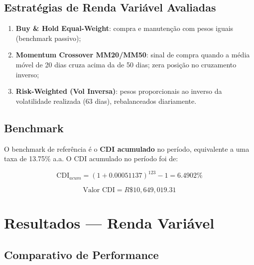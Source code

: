 \documentclass[a4paper, 12pt]{article}
\begin{document}
\subsection{Estratégias de Renda Variável Avaliadas}
\begin{enumerate}
    \item \textbf{Buy \& Hold Equal-Weight}: compra e manutenção com pesos iguais (benchmark passivo);
    \item \textbf{Momentum Crossover MM20/MM50}: sinal de compra quando a média móvel de 20 dias
          cruza acima da de 50 dias; zera posição no cruzamento inverso;
    \item \textbf{Risk-Weighted (Vol Inversa)}: pesos proporcionais ao inverso da volatilidade
          realizada (63 dias), rebalanceados diariamente.
\end{enumerate}

\subsection{Benchmark}
O benchmark de referência é o \textbf{CDI acumulado} no período, equivalente a uma
taxa de 13.75\% a.a. O CDI acumulado no período foi de:

$$\text{CDI}_{acum} = (1 + 0.00051137)^{123} - 1 = 6.4902\%$$

$$\text{Valor CDI} = R\$ 10,649,019.31$$

\newpage
\section{Resultados — Renda Variável}

\subsection{Comparativo de Performance}

\begin{table}[H]
\centering
\caption{Comparativo de performance das estratégias de Renda Variável}
\label{tab:comparativo_rv}
\end{table}
\end{document}
